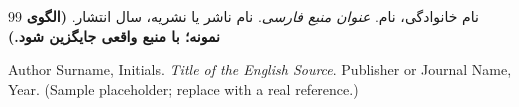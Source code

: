 \renewcommand{\bibname}{منابع}
\clearpage
{}
{}
\begin{thebibliography}{99}
نام خانوادگی، نام.
\textit{عنوان منبع فارسی}.
نام ناشر یا نشریه، سال انتشار.
\textbf{(الگوی نمونه؛ با منبع واقعی جایگزین شود.)}

\begin{latin}
Author Surname, Initials.
\textit{Title of the English Source}.
Publisher or Journal Name, Year.
(Sample placeholder; replace with a real reference.)
\end{latin}
\end{thebibliography}
